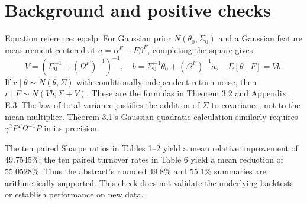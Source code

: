 \documentclass[10pt]{article}
\begin{document}
\section*{Background and positive checks}
Equation reference: eq:slp. For Gaussian prior \(N(\theta_0,\Sigma_0)\) and a Gaussian feature measurement centered at \(a=\alpha^F+F\beta^F\), completing the square gives \[
 V=(\Sigma_0^{-1}+(\Omega^F)^{-1})^{-1},\quad
 b=\Sigma_0^{-1}\theta_0+(\Omega^F)^{-1}a,\quad
 E[\theta\mid F]=Vb.\] If \(r\mid\theta\sim N(\theta,\Sigma)\) with conditionally independent return noise, then \(r\mid F\sim N(Vb,\Sigma+V)\). These are the formulas in Theorem 3.2 and Appendix E.3. The law of total variance justifies the addition of \(\Sigma\) to covariance, not to the mean multiplier. Theorem 3.1’s Gaussian quadratic calculation similarly requires \(\gamma^2 P^T\Omega^{-1}P\) in its precision.\par
The ten paired Sharpe ratios in Tables 1–2 yield a mean relative improvement of \(49.7545\%\); the ten paired turnover rates in Table 6 yield a mean reduction of \(55.0528\%\). Thus the abstract’s rounded \(49.8\%\) and \(55.1\%\) summaries are arithmetically supported. This check does not validate the underlying backtests or establish performance on new data.\par
\end{document}
